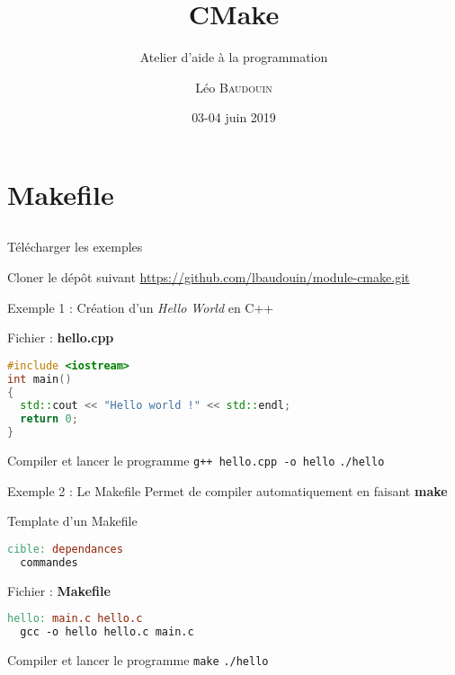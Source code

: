 \documentclass{beamer}
\title{CMake}
\subtitle{Atelier d'aide à la programmation}
\author{L\'eo \textsc{Baudouin}}
\institute{
  {\url{baudouin.leo @ gmail.com}}
}
\date{03-04 juin 2019}
\begin{document}
\begin{frame}
  \titlepage
\end{frame}

\section{Makefile}
\subsection{}

\begin{frame}[fragile]{Télécharger les exemples}
  \begin{block}{Cloner le dép\^ot suivant}
    \url{https://github.com/lbaudouin/module-cmake.git}
  \end{block}
\end{frame}

\begin{frame}[fragile]{Exemple 1 : Création d'un \textit{Hello World} en C++}

  \begin{block}{Fichier : \textbf{hello.cpp}}
  \begin{lstlisting}[language=C++]
#include <iostream>
int main()
{
  std::cout << "Hello world !" << std::endl;
  return 0;
}
\end{lstlisting}
  \end{block}
  \pause

  \begin{block}{Compiler et lancer le programme}
    \textcolor{commandcolor}{\verb?g++ hello.cpp -o hello?}\linebreak
    \textcolor{commandcolor}{\verb?./hello?}
  \end{block}

\end{frame}

\begin{frame}[fragile]{Exemple 2 : Le Makefile}
  Permet de compiler automatiquement en faisant \textbf{make}

  \begin{exampleblock}{Template d'un Makefile}
  \begin{lstlisting}[language=make]
cible: dependances
  commandes
\end{lstlisting}
  \end{exampleblock}
  \pause

  \begin{block}{Fichier : \textbf{Makefile}}
  \begin{lstlisting}[language=make]
hello: main.c hello.c
  gcc -o hello hello.c main.c
\end{lstlisting}
  \end{block}
  \pause

  \begin{block}{Compiler et lancer le programme}
    \textcolor{commandcolor}{\verb?make?}\linebreak
    \textcolor{commandcolor}{\verb?./hello?}
  \end{block}
  
\end{frame}
\end{document}
